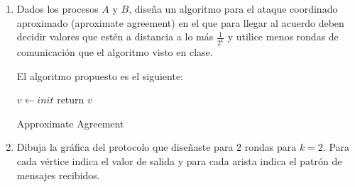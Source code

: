 \documentclass[12pt,a4paper]{report}
\begin{document}
\begin{enumerate}
	\item {
		Dados los procesos $A$ y $B$, diseña un algoritmo para el ataque coordinado
		aproximado (aproximate agreement) en el que para llegar al acuerdo deben
		decidir	valores que estén a distancia a lo más $\frac{1}{2^k}$ y utilice
		menos rondas de comunicación que el algoritmo visto en clase.

		El algoritmo propuesto es el siguiente:\\

		\IncMargin{1em}
		\begin{algorithm}
			\BlankLine
			$v \leftarrow init$ \;
			return $v$\;
			\caption{Approximate Agreement}
		\end{algorithm}\DecMargin{1em}
		

	}

	\item {
		Dibuja la gráfica del protocolo que diseñaste para 2 rondas para $k = 2$.
		Para cada vértice indica el valor de salida y para cada arista indica el
		patrón de mensajes recibidos.
	}


\end{enumerate}
\end{document}

